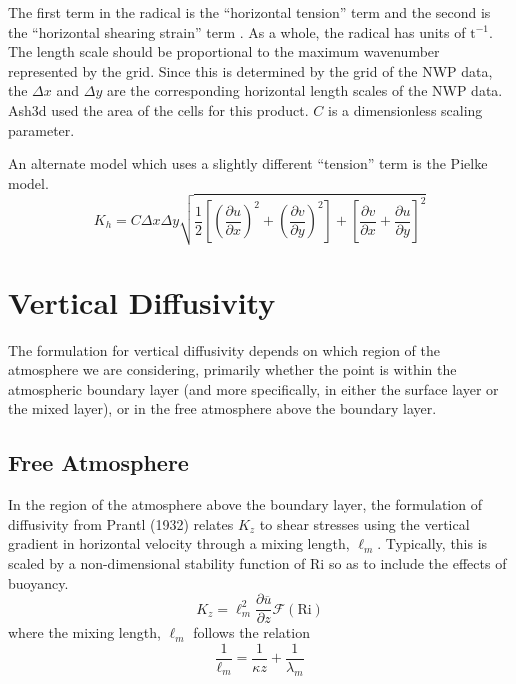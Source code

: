 The first term in the radical is the ``horizontal tension'' term and the second is
the ``horizontal shearing strain'' term \cite{Griffies2000}.
As a whole, the radical has units of $\mathrm{t}^{-1}$.
The length scale should be proportional to the maximum wavenumber represented by the grid.
Since this is determined by the grid of the NWP data, the $\Delta x$ and $\Delta y$ are the 
corresponding horizontal length scales of the NWP data. Ash3d used the area of the cells
for this product. $C$ is a dimensionless scaling parameter.

An alternate model which uses a slightly different ``tension'' term is the Pielke model.
\begin{equation}\label{VarDiff_Eq_Pielke}
K_h = C \Delta x \Delta y \sqrt{
\frac{1}{2}\left[ \left(\frac{\partial u}{\partial x}\right)^2 + \left(\frac{\partial v}{\partial y}\right)^2 \right]
+ \left[ \frac{\partial v}{\partial x} +\frac{\partial u}{\partial y} \right]^2}
\end{equation}


\section{Vertical Diffusivity}\label{ChapAppendVarDiff_Sec_Kv}
The formulation for vertical diffusivity depends on which region of the atmosphere
we are considering, primarily whether the point is within the atmospheric boundary
layer (and more specifically, in either the surface layer or the mixed layer),
or in the free atmosphere above the boundary layer.

\subsection{Free Atmosphere}
In the region of the atmosphere above the boundary layer, the formulation of diffusivity
from Prantl (1932) relates $K_z$ to shear stresses using the vertical gradient in
horizontal velocity through a mixing length, $\ell_m$. %
Typically, this is scaled by a non-dimensional stability function of $\mathrm{Ri}$ so as to
include the effects of buoyancy.
\begin{equation}\label{VarDiff_Eq_Kz_FreAtmos}
K_z = \ell_m^2 \frac{\partial \overline{u}}{\partial z}  \mathcal{F}(\mathrm{Ri})
\end{equation}
where the mixing length, $\ell_m$ follows the relation
\begin{equation}\label{VarDiff_Eq_MixLen}
\frac{1}{\ell_m} = \frac{1}{\kappa z} + \frac{1}{\lambda_m}
\end{equation}

